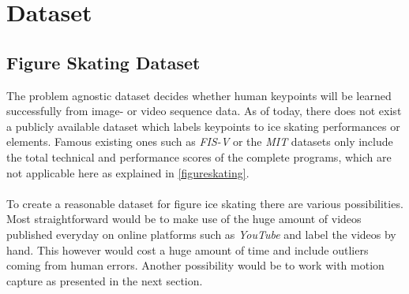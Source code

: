 

\chapter{Dataset} %

\label{dataset} %



\section{Figure Skating Dataset}

The problem agnostic dataset decides whether human keypoints
will be learned successfully from image- or video sequence data.
As of today, there does not exist a publicly available dataset which labels keypoints to ice skating performances or
elements.
Famous existing ones such as \textit{FIS-V} or the \textit{MIT} datasets only include the total technical and performance scores of the
complete programs, which are not applicable here as explained in \autoref{figureskating}.
\\\mbox{}\\
To create a reasonable dataset for figure ice skating there are various possibilities.
Most straightforward would be to make use of the huge amount of videos published everyday on online platforms such as
\textit{YouTube} and label the videos by hand. This however would cost a huge amount of time and include outliers coming from
human errors.
Another possibility would be to work with motion capture as presented in the next section.


